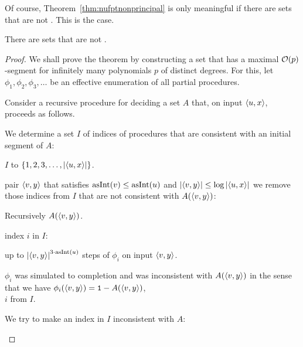 Of course, Theorem~\ref{thm:nufptnonprincipal} is only meaningful if there are  sets that are not .
This is the case.
\begin{theorem}
  There are  sets that are not .
\end{theorem}
\begin{proof}
  We shall prove the theorem by constructing a  set that has a maximal $\operatorname{\mathcal{O}}(p)$-segment for infinitely many polynomials $p$ of distinct degrees.
  For this, let $\phi_1, \phi_2, \phi_3, \ldots$ be an effective enumeration of all partial procedures.

  Consider a recursive procedure for deciding a set $A$ that, on input ${\langle u, x\rangle}$, proceeds as follows.
  \begin{codelisting}
  \item
    We determine a set $I$ of indices of procedures that are consistent with an initial segment of $A$:
    \begin{codelisting}
    \item
       $I$ to $\{1, 2, 3, \ldots, \length{\pair{u}{x}}\}$.
    \item
       pair $\pair{v}{y}$ that satisfies $\asNat(v) \le \asNat(u)$ and $\length{\pair{v}{y}} \le \log \length{\pair{u}{x}}$ we remove those indices from $I$ that are not consistent with $A(\pair{v}{y})$:
      \begin{codelisting}
      \item
        Recursively  $A(\pair{v}{y})$.
      \item
         index $i$ in $I$:
        \begin{codelisting}
        \item
           up to $\length{\pair{v}{y}}^{3 \cdot \asNat(u)}$ steps of $\phi_i$ on input $\pair{v}{y}$.
        \item
           $\phi_i$ was simulated to completion and was inconsistent with $A(\pair{v}{y})$ in the sense that we have $\phi_i(\pair{v}{y}) = \bits{1} - A(\pair{v}{y})$,
          \\\-\quad {} $i$ from $I$.
        \end{codelisting}
      \end{codelisting}
    \end{codelisting}
  \item
    We try to make an index in $I$ inconsistent with $A$:

\end{codelisting}
\end{proof}
